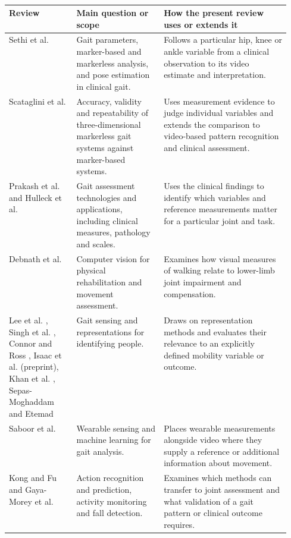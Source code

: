 \begin{table}[!ht]
\centering\small
\caption{}
\label{ExistingSurvey}
\color{RevisionBlue}\hypersetup{allcolors=RevisionBlue}
\renewcommand{\arraystretch}{1.07}
\begin{tabularx}{0.98\linewidth}{@{}>{\raggedright\arraybackslash}p{0.24\linewidth}>{\raggedright\arraybackslash}p{0.31\linewidth}>{\raggedright\arraybackslash}X@{}}
\toprule
\textbf{Review} & \textbf{Main question or scope} & \textbf{How the present review uses or extends it} \\
\midrule
Sethi et al. \cite{sethi2022comprehensive} & Gait parameters, marker-based and markerless analysis, and pose estimation in clinical gait. & Follows a particular hip, knee or ankle variable from a clinical observation to its video estimate and interpretation. \\ \addlinespace[3pt]
Scataglini et al. \cite{scataglini2024accuracy} & Accuracy, validity and repeatability of three-dimensional markerless gait systems against marker-based systems. & Uses measurement evidence to judge individual variables and extends the comparison to video-based pattern recognition and clinical assessment. \\ \addlinespace[3pt]
Prakash et al. \cite{prakash2018recent} and Hulleck et al. \cite{hulleck2022present} & Gait assessment technologies and applications, including clinical measures, pathology and scales. & Uses the clinical findings to identify which variables and reference measurements matter for a particular joint and task. \\ \addlinespace[3pt]
Debnath et al. \cite{debnath2022review} & Computer vision for physical rehabilitation and movement assessment. & Examines how visual measures of walking relate to lower-limb joint impairment and compensation. \\ \addlinespace[3pt]
Lee et al. \cite{lee2014comprehensive}, Singh et al. \cite{singh2018vision}, Connor and Ross \cite{connor2018biometric}, Isaac et al. \cite{isaac2019trait} (preprint), Khan et al. \cite{khan2021vision}, Sepas-Moghaddam and Etemad \cite{sepas2022deep} & Gait sensing and representations for identifying people. & Draws on representation methods and evaluates their relevance to an explicitly defined mobility variable or outcome. \\ \addlinespace[3pt]
Saboor et al. \cite{saboor2020latest} & Wearable sensing and machine learning for gait analysis. & Places wearable measurements alongside video where they supply a reference or additional information about movement. \\ \addlinespace[3pt]
Kong and Fu \cite{kong2022human} and Gaya-Morey et al. \cite{gaya2024deep} & Action recognition and prediction, activity monitoring and fall detection. & Examines which methods can transfer to joint assessment and what validation of a gait pattern or clinical outcome requires. \\
\bottomrule
\end{tabularx}
\end{table}

